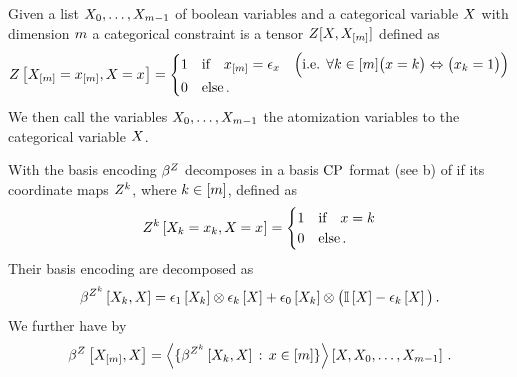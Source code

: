 \begin{definition}
    Given a list $X_{0},\ldots,X_{m-1}$ of boolean variables and a categorical variable $X$ with dimension $m$ a categorical constraint is a tensor $Z[X,X_{[m]}]$ defined as
    \begin{align*}
        Z\left[X_{[m]}=x_{[m]},X_{}=x_{}\right]
        = \begin{cases}
              1 & \text{if} \quad x_{[m]} = \epsilon_{x} \quad \Big(\text{i.e. }\forall k\in[m] \big(x=k\big) \Leftrightarrow \big(x_{k}=1\big) \Big)\\
              0 & \text{else} \, .
        \end{cases}
    \end{align*}
    We then call the variables  $X_{0},\ldots,X_{m-1}$ the atomization variables to the categorical variable $X$.
\end{definition}

With  the basis encoding $\beta^{Z}$ decomposes in a basis $\mathrm{CP}$ format (see b) of if its coordinate maps $Z^{k}$, where $k\in[m]$, defined as
\begin{align*}
    Z^{k}\left[X_{k}=x_{k},X_{}=x_{}\right]
    = \begin{cases}
          1 & \text{if} \quad x=k \\
          0 & \text{else} \, .
    \end{cases}
\end{align*}
Their basis encoding are decomposed as
\begin{align}
    \beta^{Z^{k}}\left[X_{k},X\right]
    = \epsilon_{1}\left[X_{k}\right] \otimes \epsilon_{k}\left[X\right]
    + \epsilon_{0}\left[X_{k}\right] \otimes \big(\mathbb{I}\left[X\right]- \epsilon_{k}\left[X\right]\big) \, .
\end{align}
We further have by 
\begin{align*}
    \beta^{Z}\left[X_{[m]},X\right]
    = \left\langle \{\beta^{Z^{k}}\left[X_{k},X\right] \, : \, x\in[m]\}\right\rangle \left[ X, X_{0}, \ldots, X_{m-1} \right] \, .
\end{align*}


